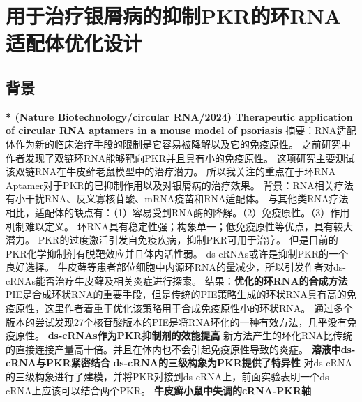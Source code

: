 \section{用于治疗银屑病的抑制PKR的环RNA适配体优化设计}
\subsection{背景}
\noindent \textbf{* (Nature Biotechnology/circular RNA/2024) Therapeutic application of circular RNA aptamers in a mouse model of psoriasis}
\newline 摘要：RNA适配体作为新的临床治疗手段的限制是它容易被降解以及它的免疫原性。
之前研究中作者发现了双链环RNA能够靶向PKR并且具有小的免疫原性。
这项研究主要测试该双链RNA在牛皮藓老鼠模型中的治疗潜力。
所以我关注的重点在于环RNA Aptamer对于PKR的已抑制作用以及对银屑病的治疗效果。
\newline 背景：RNA相关疗法有小干扰RNA、反义寡核苷酸、mRNA疫苗和RNA适配体。
与其他类RNA疗法相比，适配体的缺点有：（1）容易受到RNA酶的降解。（2）免疫原性。（3）作用机制难以定义。
环RNA具有稳定性强；构象单一；低免疫原性等优点，具有较大潜力。
\newline \indent PKR的过度激活引发自免疫疾病，抑制PKR可用于治疗。
但是目前的PKR化学抑制剂有脱靶效应并且体内活性弱。
ds-cRNAs或许是抑制PKR的一个良好选择。
\newline \indent 牛皮藓等患者部位细胞中内源环RNA的量减少，所以引发作者对ds-cRNAs能否治疗牛皮藓及相关炎症进行探索。
\newline 结果：\textbf{优化的环RNA的合成方法}
\newline \indent PIE是合成环状RNA的重要手段，但是传统的PIE策略生成的环状RNA具有高的免疫原性，这里作者着重于优化该策略用于合成免疫原性小的环状RNA。
通过多个版本的尝试发现27个核苷酸版本的PIE是将RNA环化的一种有效方法，几乎没有免疫原性。
\newline \textbf{ds-cRNAs作为PKR抑制剂的效能提高}
\newline \indent 新方法产生的环化RNA比传统的直接连接产量高十倍。并且在体内也不会引起免疫原性导致的炎症。
\newline \textbf{溶液中ds-cRNA与PKR紧密结合}
\newline \indent 
\newline \textbf{ds-cRNA的三级构象为PKR提供了特异性}
\newline \indent 对ds-cRNA的三级构象进行了建模，并将PKR对接到ds-cRNA上，前面实验表明一个ds-cRNA上应该可以结合两个PKR。
\newline \textbf{牛皮癣小鼠中失调的cRNA-PKR轴}
\newline \indent 

